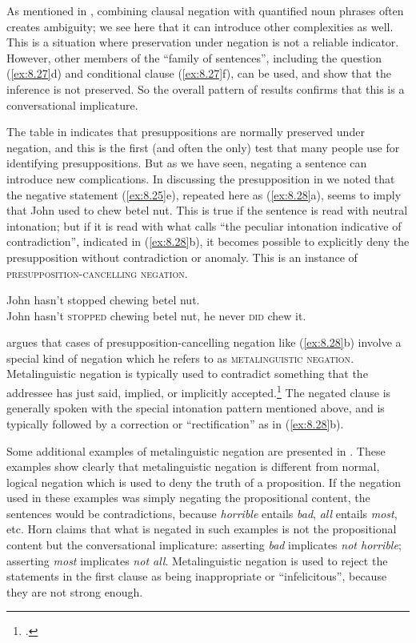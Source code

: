 As mentioned in , combining clausal negation with quantified noun phrases often creates ambiguity; we see here that it can introduce other complexities as well. This is a situation where preservation under negation is not a reliable indicator. However, other members of the “family of sentences”, including the question (\ref{ex:8.27}d) and conditional clause (\ref{ex:8.27}f), can be used, and show that the inference is not preserved. So the overall pattern of results confirms that this is a conversational implicature.



The table in  indicates that presuppositions are normally preserved under negation, and this is the first (and often the only) test that many people use for identifying presuppositions. But as we have seen, negating a sentence can introduce new complications. In discussing the presupposition in  we noted that the negative statement (\ref{ex:8.25}e), repeated here as (\ref{ex:8.28}a), seems to imply that John used to chew betel nut. This is true if the sentence is read with neutral intonation; but if it is read with what \citet{Jespersen1933} calls “the peculiar intonation indicative of contradiction”, indicated in (\ref{ex:8.28}b), it becomes possible to explicitly deny the presupposition without contradiction or anomaly. This is an instance of \textsc{presupposition-cancelling negation}.


\begin{stylepoints} \label{ex:8.28}
\ea John hasn’t stopped chewing betel nut.\\
\ex John hasn’t \textsc{stopped} chewing betel nut, he never \textsc{did} chew it.
                       \z
\end{stylepoints}


\citet{Horn1985,Horn1989} argues that cases of presupposition-cancelling negation like (\ref{ex:8.28}b) involve a special kind of negation which he refers to as \textsc{metalinguistic} \textsc{negation}. Metalinguistic negation is typically used to contradict something that the addressee has just said, implied, or implicitly accepted.\footnote{\citet[46--47]{KarttunenPeters1979}.} The negated clause is generally spoken with the special intonation pattern mentioned above, and is typically followed by a correction or “rectification” as in (\ref{ex:8.28}b).



Some additional examples of metalinguistic negation are presented in . These examples show clearly that metalinguistic negation is different from normal, logical negation which is used to deny the truth of a proposition. If the negation used in these examples was simply negating the propositional content, the sentences would be contradictions, because \textit{horrible} entails \textit{bad}, \textit{all} entails \textit{most}, etc. Horn claims that what is negated in such examples is not the propositional content but the conversational implicature: asserting \textit{bad} implicates \textit{not horrible}; asserting \textit{most} implicates \textit{not all}. Metalinguistic negation is used to reject the statements in the first clause as being inappropriate or “infelicitous”, because they are not strong enough.


